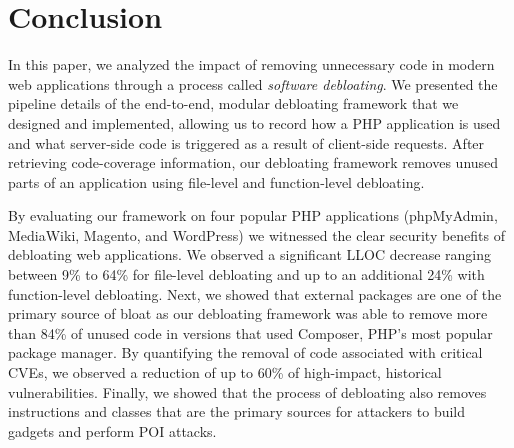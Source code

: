 \section{Conclusion}

In this paper, we analyzed the impact of removing unnecessary code in modern
web applications through a process called \textit{software debloating}.
We presented the pipeline details of the end-to-end, modular debloating
framework that we designed and implemented, allowing us to record how a
PHP application is used and what server-side code is triggered as a result of
client-side requests. After retrieving code-coverage information, our debloating
framework removes unused parts of
an application using file-level and function-level debloating.

By evaluating
our framework on four popular PHP applications (phpMyAdmin, MediaWiki,
Magento, and WordPress) we witnessed the clear security benefits of debloating web
applications. We observed a significant LLOC decrease ranging between
9\% to 64\% for file-level debloating and up to an additional 24\% with
function-level debloating. Next, we showed that external packages are one
of the primary source of bloat as our debloating framework was able to remove
more than 84\% of unused code in versions that used Composer, PHP's most popular
package manager. By quantifying the removal of code associated with critical
CVEs, we observed a reduction of up to 60\% of high-impact, historical vulnerabilities.
Finally, we showed that the process of debloating also removes
instructions and classes that are the primary sources for attackers to build
gadgets and perform POI attacks.

